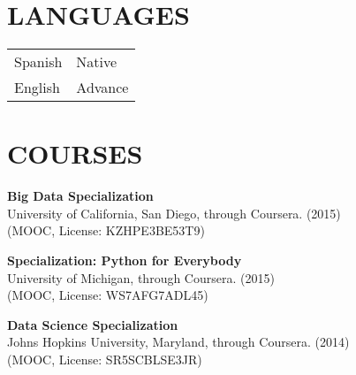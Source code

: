 \documentclass[margin]{res}
\begin{document}
\begin{resume}
\begin{tabular}{ l l }
\end{tabular}
\section{LANGUAGES}
\begin{tabular}{ l l }
  Spanish & \hspace{1.6cm} Native \\
  English & \hspace{1.6cm} Advance \\
\end{tabular}

\section{COURSES}




{\textbf{Big Data Specialization} \\
University of California, San Diego, through Coursera. (2015) \\
(MOOC, License: KZHPE3BE53T9)}

{\textbf{Specialization: Python for Everybody} \\
University of Michigan, through Coursera. (2015) \\
(MOOC, License: WS7AFG7ADL45)}

{\textbf{Data Science Specialization} \\
Johns Hopkins University, Maryland, through Coursera. (2014) \\
(MOOC, License: SR5SCBLSE3JR)}


\end{resume}
\end{document}
